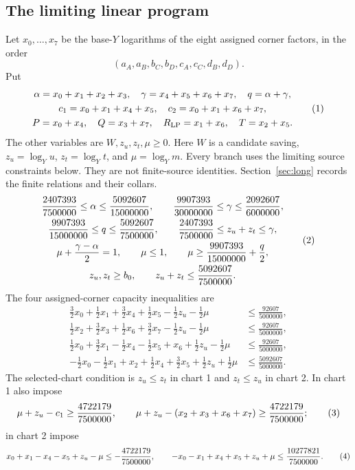 \subsection*{The limiting linear program}

Let $x_0,\ldots,x_7$ be the base-$Y$ logarithms of the eight assigned
corner factors, in the order
\[
(a_A,a_B,b_C,b_D,c_A,c_C,d_B,d_D).
\]
Put
\[
\begin{gathered}
\alpha=x_0+x_1+x_2+x_3,\quad
\gamma=x_4+x_5+x_6+x_7,\quad q=\alpha+\gamma,\\
c_1=x_0+x_1+x_4+x_5,\quad c_2=x_0+x_1+x_6+x_7,\\
P=x_0+x_4,\quad Q=x_3+x_7,\quad R_{\rm LP}=x_1+x_6,\quad T=x_2+x_5.
\end{gathered}
\AutoTag{eq:old:D_3}
\]
The other variables are $W,z_u,z_t,\mu\ge0$. Here $W$ is a
candidate saving, $z_u=\log_Yu$, $z_t=\log_Yt$, and
$\mu=\log_Ym$. Every branch uses the limiting source constraints below.
They are not finite-source identities. Section~\ref{sec:long} records the
finite relations and their collars.
\[
\begin{gathered}
\frac{2407393}{7500000}\le\alpha\le\frac{5092607}{15000000},\qquad
\frac{9907393}{30000000}\le\gamma\le\frac{2092607}{6000000},\\
\frac{9907393}{15000000}\le q\le\frac{5092607}{7500000},\qquad
\frac{2407393}{7500000}\le z_u+z_t\le\gamma,\\
\mu+\frac{\gamma-\alpha}{2}=1,\qquad
\mu\le1,\qquad \mu\ge\frac{9907393}{15000000}+\frac q2,\\
z_u,z_t\ge b_0,\qquad z_u+z_t\le\frac{5092607}{7500000}.
\end{gathered}
\AutoTag{eq:old:D_4}
\]
The four assigned-corner capacity inequalities are
\begin{align}
\frac32x_0+\frac12x_1+\frac32x_4+\frac12x_5
 -\frac12z_u-\frac12\mu&\le\frac{92607}{5000000},\label{eq:old:D_capA}\\
\frac12x_2+\frac32x_3+\frac12x_6+\frac32x_7
 -\frac12z_u-\frac12\mu&\le\frac{92607}{5000000},\label{eq:old:D_capD}\\
\frac12x_0+\frac32x_1-\frac12x_4-\frac12x_5+x_6
 +\frac12z_u-\frac12\mu&\le\frac{92607}{5000000},\label{eq:old:D_capB}\\
-\frac12x_0-\frac12x_1+x_2+\frac12x_4+\frac32x_5
 +\frac12z_u+\frac12\mu&\le\frac{5092607}{5000000}.\label{eq:old:D_capC}
\end{align}
The selected-chart condition is $z_u\le z_t$ in chart 1 and
$z_t\le z_u$ in chart 2. In chart 1 also impose
\[
\mu+z_u-c_1\ge\frac{4722179}{7500000},\qquad
\mu+z_u-(x_2+x_3+x_6+x_7)\ge\frac{4722179}{7500000};
\AutoTag{eq:old:D_5}
\]
in chart 2 impose
\[
x_0+x_1-x_4-x_5+z_u-\mu\le-\frac{4722179}{7500000},\qquad
-x_0-x_1+x_4+x_5+z_u+\mu\le\frac{10277821}{7500000}.
\AutoTag{eq:old:D_6}
\]

